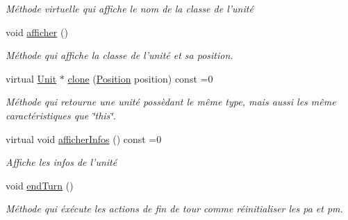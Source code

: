 \begin{DoxyCompactItemize}
\begin{DoxyCompactList}\small\item\em Méthode virtuelle qui affiche le nom de la classe de l'unité \end{DoxyCompactList}\item 
\hypertarget{classUnit_a969abe2fc267339748d665c757991c33}{void \hyperlink{classUnit_a969abe2fc267339748d665c757991c33}{afficher} ()}\label{classUnit_a969abe2fc267339748d665c757991c33}

\begin{DoxyCompactList}\small\item\em Méthode qui affiche la classe de l'unité et sa position. \end{DoxyCompactList}\item 
virtual \hyperlink{classUnit}{Unit} $\ast$ \hyperlink{classUnit_a90304713be4b7cc73f59358190dd39d4}{clone} (\hyperlink{classPosition}{Position} position) const =0
\begin{DoxyCompactList}\small\item\em Méthode qui retourne une unité possèdant le même type, mais aussi les même caractéristiques que \char`\"{}this\char`\"{}. \end{DoxyCompactList}\item 
\hypertarget{classUnit_a21808f6976e0803ebdc1efcce18bd043}{virtual void \hyperlink{classUnit_a21808f6976e0803ebdc1efcce18bd043}{afficher\+Infos} () const =0}\label{classUnit_a21808f6976e0803ebdc1efcce18bd043}

\begin{DoxyCompactList}\small\item\em Affiche les infos de l'unité \end{DoxyCompactList}\item 
\hypertarget{classUnit_a2657eec715871bdfc44711526bcff5fa}{void \hyperlink{classUnit_a2657eec715871bdfc44711526bcff5fa}{end\+Turn} ()}\label{classUnit_a2657eec715871bdfc44711526bcff5fa}

\begin{DoxyCompactList}\small\item\em Méthode qui éxécute les actions de fin de tour comme réinitialiser les pa et pm. \end{DoxyCompactList}\end{DoxyCompactItemize}
